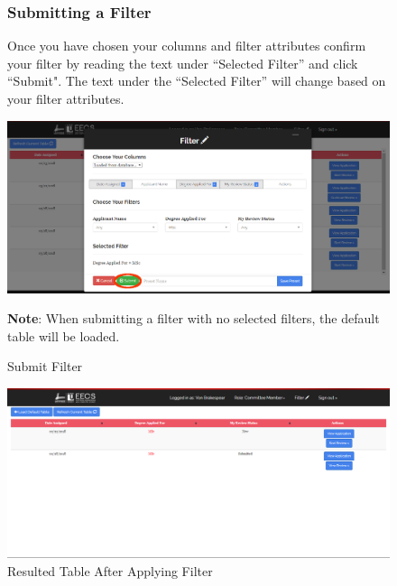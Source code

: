 \documentclass[fontsize=12pt,paper=letter,twoside]{scrartcl}
\begin{document}
\clearpage 
\begin{figure}[!htb]
\subsubsection{Submitting a Filter}
Once you have chosen your columns and filter attributes confirm your filter by reading the text under ``Selected Filter'' and click ``Submit". The text under the ``Selected Filter'' will change based on your filter attributes.
\begin{center}
\includegraphics[width=.9\textwidth]{images/cm/submit_filter.png}
\end{center}
\caption{Submit Filter}
\textbf{Note}: When submitting a filter with no selected filters, the default table will be loaded.
\label{fig:cm:submit_filter}
\end{figure}

\begin{figure}[!htb]
\begin{center}
\includegraphics[width=.9\textwidth]{images/cm/example_filter_table.png}
\end{center}
\caption{Resulted Table After Applying Filter}
\label{fig:cm:resulted_table}
\end{figure}

\clearpage
\end{document}
